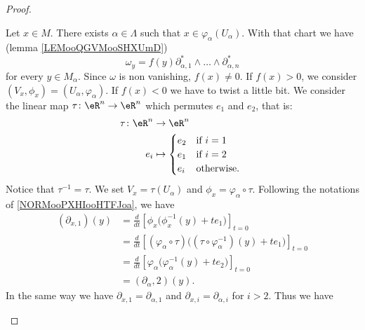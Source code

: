 \begin{proof}
\begin{subproof}
		Let \( x\in M\). There exists \( \alpha\in \Lambda\) such that \( x\in \varphi_{\alpha}(U_{\alpha})\). With that chart we have (lemma \ref{LEMooQGVMooSHXUmD})
		\begin{equation}
			\omega_y=f(y)\partial^*_{\alpha, 1}\wedge\ldots \wedge\partial^*_{\alpha,n}
		\end{equation}
		for every \( y\in M_{\alpha}\). Since \( \omega\) is non vanishing, \( f(x)\neq 0\). If \( f(x)>0\), we consider \( (V_x,\phi_x)=(U_{\alpha}, \varphi_{\alpha})\). If \( f(x)<0\) we have to twist a little bit. We consider the linear map \(\tau \colon \eR^n\to \eR^n  \) which permutes \( e_1\) and \( e_2\), that is:
		\begin{equation}
			\begin{aligned}
				\tau\colon \eR^n & \to \eR^n                        \\
				e_i              & \mapsto \begin{cases}
					                           e_2 & \text{if } i=1     \\
					                           e_1 & \text{if }i=2      \\
					                           e_i & \text{otherwise. }
				                           \end{cases}
			\end{aligned}
		\end{equation}
		Notice that \( \tau^{-1}=\tau\). We set \( V_x=\tau(U_{\alpha})\) and \( \phi_x=\varphi_{\alpha}\circ\tau\). Following the notations of \ref{NORMooPXHIooHTFJoa}, we have
		\begin{subequations}
			\begin{align}
				(\partial_{x,1})(y) & =\frac{d}{dt} \left[ \phi_x\big( \phi_x^{-1}(y)+te_1 \big)  \right]_{t=0}                                            \\
				                    & =\frac{d}{dt} \left[ (\varphi_{\alpha}\circ \tau)\big( (\tau\circ\varphi_{\alpha}^{-1})(y)+te_1 \big)  \right]_{t=0} \\
				                    & =\frac{d}{dt} \left[ \varphi_{\alpha}\big( \varphi_{\alpha}^{-1}(y)+te_2 \big)  \right]_{t=0}                        \\
				                    & =(\partial_{\alpha}, 2)(y).
			\end{align}
		\end{subequations}
		In the same way we have \( \partial_{x,1}=\partial_{\alpha,1}\) and \( \partial_{x,i}=\partial_{\alpha,i}\) for \( i>2\). Thus we have
		\begin{equation}

\end{equation}
\end{subproof}
\end{proof}
